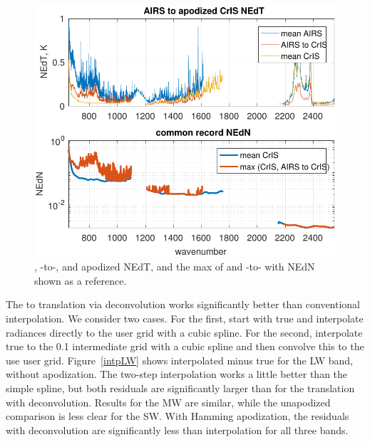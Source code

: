 \documentclass[10pt,twocolumn]{article}  %
\begin{document}
\begin{figure} %
  \centering
  \includegraphics[width=\linewidth]{figures/a2cris_nedt.pdf}
  \caption{{\airs}, {\airs}-to-{\cris}, and {\cris} apodized NEdT,
    and the max of {\cris} and {\airs}-to-{\cris} with {\cris}
    NEdN shown as a reference.}
  \label{nedt}
\end{figure}

The {\airs} to {\cris} translation via deconvolution works
significantly better than conventional interpolation.  We consider
two cases.  For the first, start with true {\airs} and interpolate
radiances directly to the {\cris} user grid with a cubic spline.
For the second, interpolate true {\airs} to the 0.1 {\wn}
intermediate grid with a cubic spline and then convolve this to the
use {\cris} user grid.  Figure~\ref{intpLW} shows interpolated
{\cris} minus true {\cris} for the LW band, without apodization.
The two-step interpolation works a little better than the simple
spline, but both residuals are significantly larger than for the
translation with deconvolution.  Results for the MW are similar,
while the unapodized comparison is less clear for the SW.  With
Hamming apodization, the residuals with deconvolution are
significantly less than interpolation for all three bands.
\end{document}
